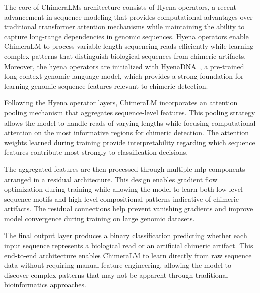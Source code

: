 \documentclass[pdflatex,sn-nature]{sn-jnl}%
\theoremstyle{thmstyleone}%
\theoremstyle{thmstyletwo}%
\theoremstyle{thmstylethree}%
\begin{document}
The core of ChimeraLM\textquotesingle s architecture consists of Hyena operators, a recent advancement in sequence modeling that provides computational advantages over traditional transformer attention mechanisms while maintaining the ability to capture long-range dependencies in genomic sequences.
Hyena operators enable ChimeraLM to process variable-length sequencing reads efficiently while learning complex patterns that distinguish biological sequences from chimeric artifacts.
Moreover, the hyena operators are initialized with HyenaDNA~\cite{nguyen2023hyenadna}, a pre-trained long-context genomic language model, which provides a strong foundation for learning genomic sequence features relevant to chimeric detection.

Following the Hyena operator layers, ChimeraLM incorporates an attention pooling mechanism that aggregates sequence-level features.
This pooling strategy allows the model to handle reads of varying lengths while focusing computational attention on the most informative regions for chimeric detection.
The attention weights learned during training provide interpretability regarding which sequence features contribute most strongly to classification decisions.

The aggregated features are then processed through multiple \gls{mlp} components arranged in a residual architecture.
This design enables gradient flow optimization during training while allowing the model to learn both low-level sequence motifs and high-level compositional patterns indicative of chimeric artifacts.
The residual connections help prevent vanishing gradients and improve model convergence during training on large genomic datasets.

The final output layer produces a binary classification predicting whether each input sequence represents a biological read or an artificial chimeric artifact.
This end-to-end architecture enables ChimeraLM to learn directly from raw sequence data without requiring manual feature engineering, allowing the model to discover complex patterns that may not be apparent through traditional bioinformatics approaches.
\end{document}
